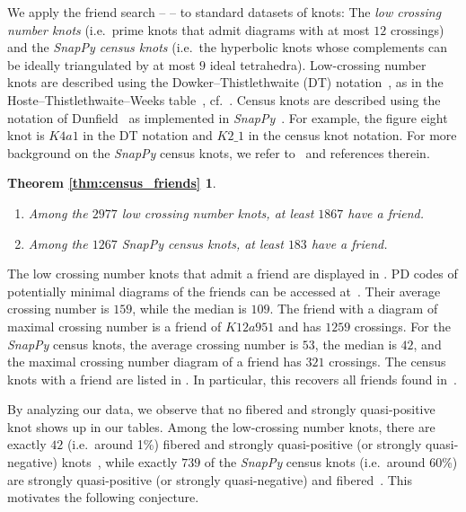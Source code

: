 \documentclass{amsart} %
\theoremstyle{thm}
\newtheorem*{thm:census_friends}{Theorem \ref{thm:census_friends}}
\theoremstyle{definition}
\numberwithin{equation}{section}
\begin{document}
We apply the friend search --  -- to standard datasets of knots: The \textit{low crossing number knots} (i.e.\ prime knots that admit diagrams with at most $12$ crossings) and the \textit{SnapPy census knots} (i.e.\ the hyperbolic knots whose complements can be ideally triangulated by at most $9$ ideal tetrahedra). Low-crossing number knots are described using the Dowker–Thistlethwaite (DT) notation~\cite{DT_notation}, as in the Hoste–Thistlethwaite–Weeks table~\cite{HTW_table}, cf.~\cite{KnotInfo}. Census knots are described using the notation of Dunfield~\cite{Dunfield_census} as implemented in {\em SnapPy}~\cite{SnapPy}. For example, the figure eight knot is $K4a1$ in the DT notation and $K2\_1$ in the census knot notation. For more background on the {\em SnapPy} census knots, we refer to~\cite{Dunfield_L_space,ABG+19,Baker_Kegel_braid,BKM_alt,BKM_QA,census10} and references therein.

\begin{thm:census_friends}\hfill
\begin{enumerate}
    \item Among the $2977$ low crossing number knots, at least $1867$ have a friend.
    \item Among the $1267$ {\em SnapPy} census knots, at least $ 183$ have a friend.
\end{enumerate}
\end{thm:census_friends}

The low crossing number knots that admit a friend are displayed in . PD codes of potentially minimal diagrams of the friends can be accessed at~\cite{data}. Their average crossing number is $159$, while the median is $109$. The friend with a diagram of maximal crossing number is a friend of $K12a951$ and has $1259$ crossings. For the {\em SnapPy} census knots, the average crossing number is $53$, the median is $42$, and the maximal crossing number diagram of a friend has $321$ crossings. The census knots with a friend are listed in . In particular, this recovers all friends found in~\cite{Kegel_Weiss}.

By analyzing our data, we observe that no fibered and strongly quasi-positive knot shows up in our tables. Among the low-crossing number knots, there are exactly $42$ (i.e.\ around 1\%) fibered and strongly quasi-positive (or strongly quasi-negative) knots~\cite{KnotInfo}, while  exactly $739$ of the {\em SnapPy} census knots (i.e.\ around 60\%) are strongly quasi-positive (or strongly quasi-negative) and fibered~\cite{CensusKnotInvariants}. This motivates the following conjecture. 
\end{document}
